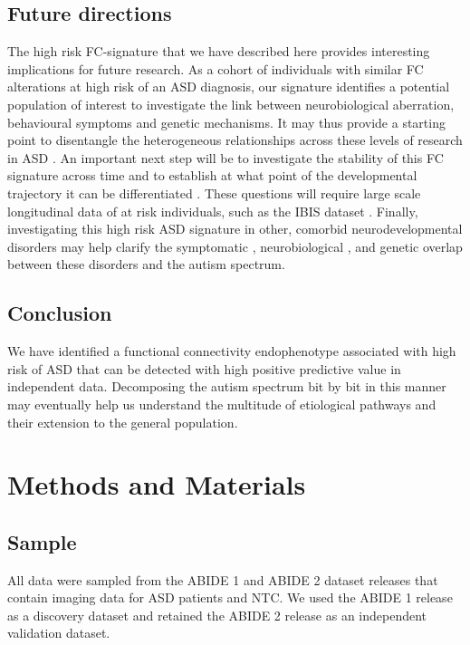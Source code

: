 \documentclass[9pt,lineno]{elife}
\begin{document}
\subsection{Future directions}
The high risk FC-signature that we have described here provides interesting implications for future research. As a cohort of individuals with similar FC alterations at high risk of an ASD diagnosis, our signature identifies a potential population of interest to investigate the link between neurobiological aberration, behavioural symptoms and genetic mechanisms. It may thus provide a starting point to disentangle the heterogeneous relationships across these levels of research in ASD \citep{Lombardo2019-mf}. An important next step will be to investigate the stability of this FC signature across time \citep{Jacob2019-zf} and to establish at what point of the developmental trajectory it can be differentiated \citep{Emerson2017-ne}. These questions will require large scale longitudinal data of at risk individuals, such as the IBIS dataset \citep{Wolff2012-vq}. Finally, investigating this high risk ASD signature in other, comorbid \citep{Simonoff2008-fr} neurodevelopmental disorders may help clarify the symptomatic \citep{Grzadzinski2011-rt}, neurobiological \citep{Van_den_Heuvel2019-ft,De_Lange2019-yy}, and genetic \citep{Cross-Disorder_Group_of_the_Psychiatric_Genomics_Consortium2013-au} overlap between these disorders and the autism spectrum.

\subsection{Conclusion}
We have identified a functional connectivity endophenotype associated with high risk of ASD that can be detected with high positive predictive value in independent data. Decomposing the autism spectrum bit by bit in this manner may eventually help us understand the multitude of etiological pathways and their extension to the general population.

\section{Methods and Materials}
\label{methods}
\subsection{Sample}
All data were sampled from the ABIDE 1 \citep{Di_Martino2014-po} and ABIDE 2 \citep{Di_Martino2017-md} dataset releases that contain imaging data for ASD patients and NTC. We used the ABIDE 1 release as a discovery dataset and retained the ABIDE 2 release as an independent validation dataset.
\end{document}
